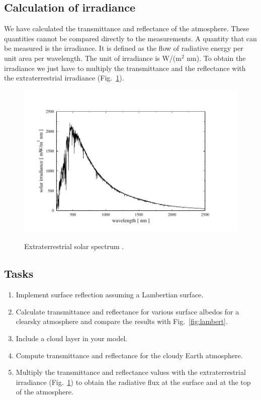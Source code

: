 \documentclass[12pt,twoside,a4paper]{article}
\begin{document}
\subsection{Calculation of irradiance}
We have calculated the transmittance and reflectance of the
atmosphere. These quantities cannot be compared directly to the
measurements. A quantity that can be measured is the irradiance. It is
defined as the flow of radiative energy per unit area per wavelength.
The unit of
irradiance is W/(m$^2$ nm). To obtain the irradiance we just have to
multiply the transmittance and the reflectance with the
extraterrestrial irradiance (Fig.~\ref{fig:solar_spectrum}).

\begin{figure}[htbp]
  \centering
  \includegraphics[width=1.\hsize]{./figs/kurutz.pdf}\\
  \caption{Extraterrestrial solar spectrum \citep{kurucz92}.}
  \label{fig:solar_spectrum}
\end{figure}


\subsection{Tasks}
\begin{enumerate}

\item Implement surface reflection assuming a Lambertian surface.
\item Calculate transmittance and reflectance for various surface
  albedos for a clearsky atmosphere and compare the results with 
  Fig.~\ref{fig:lambert}. 
\item Include a cloud layer in your model.
\item Compute transmittance and reflectance for the cloudy Earth
  atmosphere.
\item Multiply the transmittance and reflectance values with the
  extraterrestrial irradiance (Fig.~\ref{fig:solar_spectrum}) to
  obtain the radiative flux at the 
  surface and at the top of the atmosphere. 
 
\end{enumerate}
 
\end{document}
